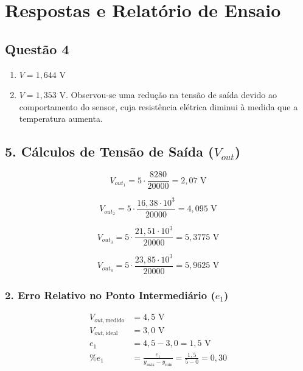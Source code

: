 \section*{Respostas e Relatório de Ensaio}

\subsection*{Questão 4}
\begin{enumerate}
    \item[\textbf{a)}] $V = 1{,}644\text{ V}$
    
    \item[\textbf{b)}] $V = 1{,}353\text{ V}$. Observou-se uma redução na tensão de saída devido ao comportamento do sensor, cuja resistência elétrica diminui à medida que a temperatura aumenta.

\end{enumerate}



\subsection*{5. Cálculos de Tensão de Saída ($V_{out}$)}

\begin{equation*}
V_{out_1} = 5 \cdot \frac{8280}{20000} = 2,07\text{ V}
\end{equation*}

\begin{equation*}
V_{out_2} = 5 \cdot \frac{16,38 \cdot 10^3}{20000} = 4,095\text{ V}
\end{equation*}

\begin{equation*}
V_{out_3} = 5 \cdot \frac{21,51 \cdot 10^3}{20000} = 5,3775\text{ V}
\end{equation*}

\begin{equation*}
V_{out_4} = 5 \cdot \frac{23,85 \cdot 10^3}{20000} = 5,9625\text{ V}
\end{equation*}

\subsubsection*{2. Erro Relativo no Ponto Intermediário ($e_1$)}

\begin{align*}
V_{out, \text{medido}} &= 4,5\text{ V} \\
V_{out, \text{ideal}} &= 3,0\text{ V} \\[6pt]
e_1 &= 4,5 - 3,0 = 1,5\text{ V} \\[6pt]
\% e_1 &= \frac{e_1}{y_{\text{máx}} - y_{\text{mín}}} = \frac{1,5}{5 - 0} = 0,30
\end{align*}

